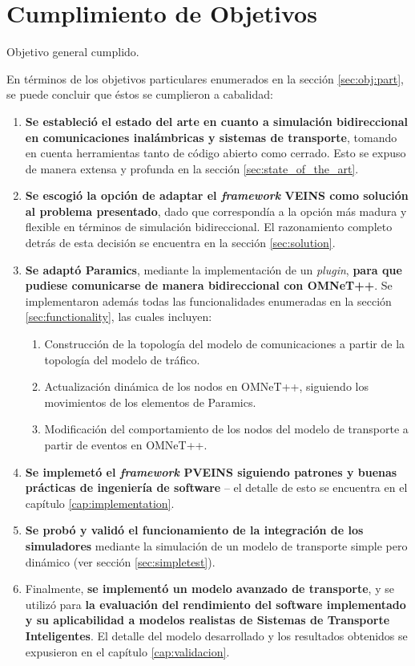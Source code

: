 \section{Cumplimiento de Objetivos}
Objetivo general cumplido.

En términos de los objetivos particulares enumerados en la sección \ref{sec:obj:part}, se puede concluir que éstos se cumplieron a cabalidad:

\begin{enumerate}
    \item \textbf{Se estableció el estado del arte en cuanto a simulación bidireccional en comunicaciones inalámbricas y sistemas de transporte}, tomando en cuenta herramientas tanto de código abierto como cerrado. Esto se expuso de manera extensa y profunda en la sección \ref{sec:state_of_the_art}.
    
    \item \textbf{Se escogió la opción de adaptar el \emph{framework} VEINS como solución al problema presentado}, dado que correspondía a la opción más madura y flexible en términos de simulación bidireccional. El razonamiento completo detrás de esta decisión se encuentra en la sección \ref{sec:solution}.
    
    \item \textbf{Se adaptó Paramics}, mediante la implementación de un \emph{plugin}, \textbf{para que pudiese comunicarse de manera bidireccional con OMNeT++}. Se implementaron además todas las funcionalidades enumeradas en la sección \ref{sec:functionality}, las cuales incluyen:
    \begin{enumerate}
        \item Construcción de la topología del modelo de comunicaciones a partir de la topología del modelo de tráfico.
        \item Actualización dinámica de los nodos en OMNeT++, siguiendo los movimientos de los elementos de Paramics.
        \item Modificación del comportamiento de los nodos del modelo de transporte a partir de eventos en OMNeT++.
    \end{enumerate}
    \item \textbf{Se implemetó el \emph{framework} PVEINS siguiendo patrones y buenas prácticas de ingeniería de software} -- el detalle de esto se encuentra en el capítulo \ref{cap:implementation}.
    
    \item \textbf{Se probó y validó el funcionamiento de la integración de los simuladores} mediante la simulación de un modelo de transporte simple pero dinámico (ver sección \ref{sec:simpletest}).
    
    \item Finalmente, \textbf{se implementó un modelo avanzado de transporte}, y se utilizó para \textbf{la evaluación del rendimiento del software implementado y su aplicabilidad a modelos realistas de Sistemas de Transporte Inteligentes}. El detalle del modelo desarrollado y los resultados obtenidos se expusieron en el capítulo \ref{cap:validacion}.
\end{enumerate}